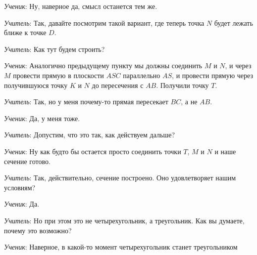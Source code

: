 \documentclass[a4paper,14pt,russian]{extreport}
\begin{document}
\textit{Ученик}: Ну, наверное да, смысл останется тем же.

\textit{Учитель}: Так, давайте посмотрим такой вариант, где теперь точка $N$ будет лежать ближе к точке $D$.




\begin{center}
    \begin{minipage}{\textwidth}
        \centering
    \end{minipage}
\end{center}

\textit{Учитель}: Как тут будем строить?

\textit{Ученик}: Аналогично предыдущему пункту мы должны соединить $M$ и $N$, и через $M$ провести прямую в плоскости $ASC$ параллельно $AS$, и провести прямую через получившуюся точку $K$ и $N$ до пересечения с $AB$. Получили точку $T$.

\textit{Учитель}: Так, но у меня почему-то прямая пересекает $BC$, а не $AB$.

\textit{Ученик}: Да, у меня тоже.

\textit{Учитель}: Допустим, что это так, как действуем дальше?

\textit{Ученик}: Ну как будто бы остается просто соединить точки $T$, $M$ и $N$ и наше сечение готово.


\begin{center}
    \begin{minipage}{\textwidth}
        \centering
    \end{minipage}
\end{center}

\textit{Учитель}: Так, действительно, сечение построено. Оно удовлетворяет нашим условиям?

\textit{Ученик}: Да.

\textit{Учитель}: Но при этом это не четырехугольник, а треугольник. Как вы думаете, почему это возможно?

\textit{Ученик}: Наверное, в какой-то момент четырехугольник станет треугольником
\end{document}
